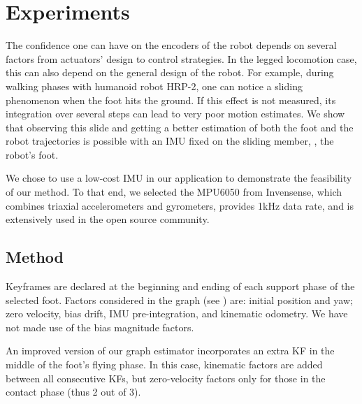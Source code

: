 
\section{Experiments} \label{sec:experiments}

The confidence one can have on the encoders of the robot depends on several factors from actuators' design to control strategies. 
In the legged locomotion case, this can also depend on the general design of the robot.
For example, during walking phases with humanoid robot HRP-2, one can notice a sliding phenomenon when the foot hits the ground. 
If this effect is not measured, its integration over several steps can lead to very poor motion estimates. 
We show that observing this slide and getting a better estimation of both the foot and the robot trajectories is possible with an IMU fixed on the sliding member, \ie, the robot's foot.

We chose to use a low-cost IMU in our application to demonstrate the feasibility of our method. 
To that end, we selected the MPU6050 from Invensense, which combines triaxial accelerometers and gyrometers, provides 1kHz data rate, and is extensively used in the open source community.

\subsection{Method}


Keyframes are declared at the beginning and ending of each support phase of the selected foot. Factors considered in the graph (see ) are: initial position and yaw; zero velocity, bias drift, IMU pre-integration, and kinematic odometry. We have not made use of the bias magnitude factors.

An improved version of our graph estimator incorporates an extra KF in the middle of the foot's flying phase. In this case, kinematic factors are added between all consecutive KFs, but zero-velocity factors only for those in the contact phase (thus 2 out of 3).

%

